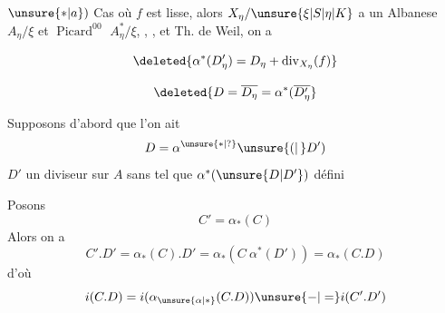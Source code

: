 $\unsure{*|a})$ Cas où $f$ est lisse, alors $X_{\eta}/\unsure{\xi|S|\eta|K}$ a un Albanese $A_{\eta}/\xi$ et $\operatorname{Picard}^{00}$ $A_{\eta}^{*}/\xi$, ,  ,  et Th. de Weil, on a


 


\[
\deleted{\alpha^*(D'_{\eta})=D_{\eta}+\operatorname{div}_{X_{\eta}}(f)}
\]

\[
\deleted{D=\overline{D_{\eta}}=\alpha^*(\overline{D'_{\eta}}}
\]

Supposons d'abord que l'on ait
\[
D=\alpha^{\unsure{*|?}}\unsure{(|\,}D')
\]
$D'$ un diviseur sur $A$ sans  tel que $\alpha^{*}(\unsure{D|D'})$ défini

Posons
\[
C'=\alpha_*(C)
\]
Alors on a
\[
C'.D'=\alpha_*(C).D'=\alpha_*(C\ \alpha^*(D'))=\alpha_*(C.D)
\]
d'où
\[
i(C.D)=i(\alpha_{\unsure{\alpha|*}}(C.D))\unsure{-|=}i(C'.D')
\]
